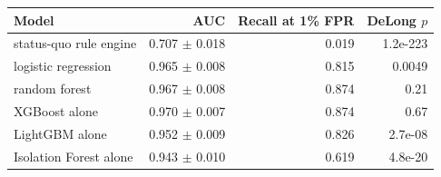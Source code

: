 \begin{tabular}{lrrr}
\toprule
Model & AUC & Recall at 1\% FPR & DeLong $p$ \\
\midrule
status-quo rule engine & 0.707 $\pm$ 0.018 & 0.019 & 1.2e-223 \\
logistic regression & 0.965 $\pm$ 0.008 & 0.815 & 0.0049 \\
random forest & 0.967 $\pm$ 0.008 & 0.874 & 0.21 \\
XGBoost alone & 0.970 $\pm$ 0.007 & 0.874 & 0.67 \\
LightGBM alone & 0.952 $\pm$ 0.009 & 0.826 & 2.7e-08 \\
Isolation Forest alone & 0.943 $\pm$ 0.010 & 0.619 & 4.8e-20 \\
\bottomrule
\end{tabular}
